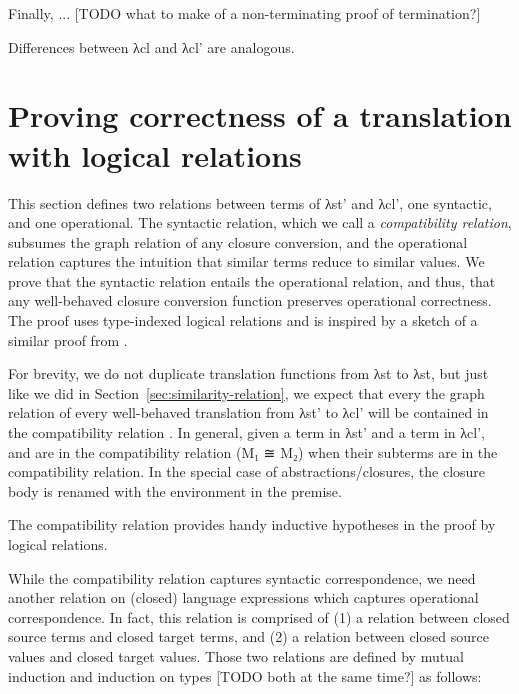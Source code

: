 \documentclass[bsc,frontabs,oneside,singlespacing,parskip,deptreport]{infthesis}
\theoremstyle{definition}
\theoremstyle{lemma}
\begin{document}
Finally, ... [TODO what to make of a non-terminating proof of
termination?]


Differences between λcl and λcl' are analogous.

\section{Proving correctness of a translation with logical relations}
\label{sec:logical-relations}

This section defines two relations between terms of λst' and λcl', one
syntactic, and one operational. The syntactic relation, which we call
a \textit{compatibility relation}, subsumes the graph relation of any
closure conversion, and the operational relation captures the
intuition that similar terms reduce to similar values. We prove that
the syntactic relation entails the operational relation, and thus,
that any well-behaved closure conversion function preserves
operational correctness. The proof uses type-indexed logical relations
and is inspired by a sketch of a similar proof from
\cite{DBLP:conf/popl/MinamideMH96}.

For brevity, we do not duplicate translation functions from λst to
λst, but just like we did in Section~\ref{sec:similarity-relation}, we
expect that every the graph relation of every well-behaved translation
from λst' to λcl' will be contained in the compatibility relation
. In general, given a term  in λst' and a term  in
λcl',  and  are in the compatibility relation (M₁ ≅ M₂)
when their subterms are in the compatibility relation. In the special
case of abstractions/closures, the closure body is renamed with the
environment in the premise.


The compatibility relation provides handy inductive hypotheses in the
proof by logical relations.

While the compatibility relation captures syntactic correspondence, we
need another relation on (closed) language expressions which captures
operational correspondence. In fact, this relation  is
comprised of (1) a relation \AS{\ti} between closed source terms and
closed target terms, and (2) a relation  between closed source
values and closed target values. Those two relations are defined by
mutual induction and induction on types [TODO both at the same time?]
as follows:
\end{document}
